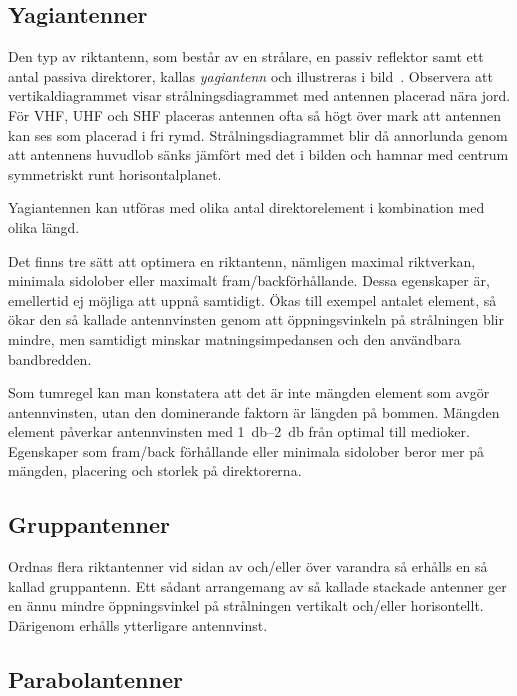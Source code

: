 \subsection{Yagiantenner}
\label{antenner_vhf_yagi}


Den typ av riktantenn, som består av en strålare, en passiv reflektor
samt ett antal passiva direktorer, kallas \emph{yagiantenn} och illustreras i
bild~.
Observera att vertikaldiagrammet visar strålningsdiagrammet med antennen
placerad nära jord.
För VHF, UHF och SHF placeras antennen ofta så högt över mark att antennen kan
ses som placerad i fri rymd.
Strålningsdiagrammet blir då annorlunda genom att antennens huvudlob sänks jämfört
med det i bilden och hamnar med centrum symmetriskt runt horisontalplanet.

Yagiantennen kan utföras med olika antal direktorelement i kombination med
olika längd.

Det finns tre sätt att optimera en riktantenn, nämligen maximal
riktverkan, minimala sidolober eller maximalt fram/backförhållande.
Dessa egenskaper är, emellertid ej möjliga att uppnå samtidigt.
Ökas till exempel antalet element, så ökar den så kallade antennvinsten genom
att öppningsvinkeln på strålningen blir mindre, men samtidigt minskar
matningsimpedansen och den användbara bandbredden.

Som tumregel kan man konstatera att det är inte mängden element som
avgör antennvinsten, utan den dominerande faktorn är längden på bommen.
Mängden element påverkar antennvinsten med \SIrange{1}{2}{\decibel} från optimal
till medioker.
Egenskaper som fram/back förhållande eller minimala sidolober beror mer
på mängden, placering och storlek på direktorerna.

\subsection{Gruppantenner}

Ordnas flera riktantenner vid sidan av och/eller över varandra så
erhålls en så kallad gruppantenn.
Ett sådant arrangemang av så kallade stackade antenner ger en ännu mindre
öppningsvinkel på strålningen vertikalt och/eller horisontellt.
Därigenom erhålls ytterligare antennvinst.

\subsection{Parabolantenner}

